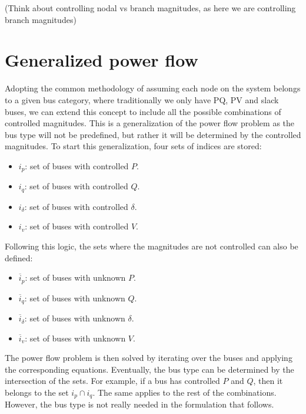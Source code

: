 \documentclass[11pt]{article}
\begin{document}
	(Think about controlling nodal vs branch magnitudes, as here we are controlling branch magnitudes)

\section{Generalized power flow}
Adopting the common methodology of assuming each node on the system belongs to a given bus category, where traditionally we only have PQ, PV and slack buses, we can extend this concept to include all the possible combinations of controlled magnitudes. This is a generalization of the power flow problem as the bus type will not be predefined, but rather it will be determined by the controlled magnitudes. To start this generalization, four sets of indices are stored:

\begin{itemize}
	\item $i_p$: set of buses with controlled $P$.
	\item $i_q$: set of buses with controlled $Q$.
	\item $i_\delta$: set of buses with controlled $\delta$.
	\item $i_v$: set of buses with controlled $V$.
\end{itemize}
Following this logic, the sets where the magnitudes are not controlled can also be defined:
\begin{itemize}
	\item $\overline{i}_p$: set of buses with unknown $P$.
	\item $\overline{i}_q$: set of buses with unknown $Q$.
	\item $\overline{i}_\delta$: set of buses with unknown $\delta$.
	\item $\overline{i}_v$: set of buses with unknown $V$.
\end{itemize}

The power flow problem is then solved by iterating over the buses and applying the corresponding equations. Eventually, the bus type can be determined by the intersection of the sets. For example, if a bus has controlled $P$ and $Q$, then it belongs to the set $i_p \cap i_q$. The same applies to the rest of the combinations. However, the bus type is not really needed in the formulation that follows.
\end{document}
